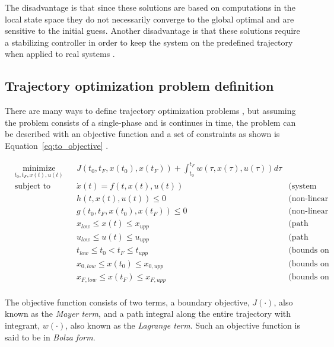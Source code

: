 The disadvantage is that since these solutions are based on computations in the local state space they do not necessarily converge to the global optimal and are sensitive to the initial guess. Another disadvantage is that these solutions require a stabilizing controller in order to keep the system on the predefined trajectory when applied to real systems \cite{kelly2017introduction}.

\subsection{Trajectory optimization problem definition}
There are many ways to define trajectory optimization problems \cite{rao2009survey}, but assuming the problem consists of a single-phase and is continues in time, the problem can be described with an objective function and a set of constraints as shown is Equation~\ref{eq:to_objective} \cite{kelly2017introduction}. 

\begin{equation}
    \begin{aligned}
    & \underset{t_0, t_F, x(t), u(t)}{\text{minimize}}
    & & J\left( t_0, t_F, x(t_0), x(t_F)\right)
        + \int_{t_0}^{t_F} w(\tau, x(\tau), u(\tau)) d\tau \\
    & \text{subject to}
    & & \dot x(t) = f(t, x(t), u(t)) & \text{(system dynamics)} \\
    & & & h(t, x(t), u(t)) \leq 0 & \text{(non-linear path constraints)} \\
    & & & g(t_0, t_F, x(t_0), x(t_F)) \leq 0 & \text{(non-linear boundary constraints)} \\
    & & & x_{low} \leq x(t) \leq x_{upp} & \text{(path bounds on state)} \\
    & & & u_{low} \leq u(t) \leq u_{upp} & \text{(path bounds on control)} \\
    & & & t_{low} \leq t_0 < t_F \leq t_{upp} & \text{(bounds on initial and final time)} \\
    & & & x_{0,low} \leq x(t_0) \leq x_{0,upp} & \text{(bounds on initial state)} \\
    & & & x_{F,low} \leq x(t_F) \leq x_{F,upp} & \text{(bounds on final state)} \\
\end{aligned}
\label{eq:to_objective}
\end{equation}

The objective function consists of two terms, a boundary objective, $J(\cdot)$, also known as the \emph{Mayer term}, and a path integral along the entire trajectory with integrant, $w(\cdot)$, also known as the \emph{Lagrange term}. Such an objective function is said to be in \emph{Bolza form}.

